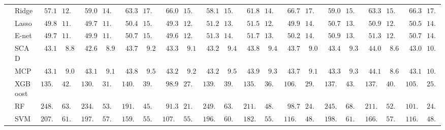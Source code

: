\begin{tabular}{p{0.2cm}p{1cm}|p{0.6cm}p{0.6cm}|p{0.6cm}p{0.6cm}p{0.6cm}p{0.6cm}p{0.6cm}p{0.6cm}|p{0.6cm}p{0.6cm}p{0.6cm}p{0.6cm}p{0.6cm}p{0.6cm}|p{0.6cm}p{0.6cm}p{0.6cm}p{0.6cm}p{0.6cm}p{0.6cm}}
 & Ridge  & $\phantom{0}57.10$ & $12.52$ & $\phantom{0}59.04$ & $14.93$ & $\phantom{0}63.31$ & $17.65$ & $\phantom{0}66.07$ & $15.44$ & $\phantom{0}58.14$ & $15.81$ & $\phantom{0}61.86$ & $14.53$ & $\phantom{0}66.75$ & $17.06$ & $\phantom{0}59.05$ & $15.22$ & $\phantom{0}63.33$ & $15.43$ & $\phantom{0}66.31$ & $17.89$ \\
 & Lasso  & $\phantom{0}49.81$ & $11.71$ & $\phantom{0}49.71$ & $11.93$ & $\phantom{0}50.42$ & $15.09$ & $\phantom{0}49.32$ & $12.76$ & $\phantom{0}51.21$ & $13.98$ & $\phantom{0}51.53$ & $12.83$ & $\phantom{0}49.91$ & $14.84$ & $\phantom{0}50.70$ & $13.98$ & $\phantom{0}50.96$ & $12.09$ & $\phantom{0}50.52$ & $14.55$ \\
 & E-net  & $\phantom{0}49.78$ & $11.75$ & $\phantom{0}49.91$ & $11.82$ & $\phantom{0}50.79$ & $15.58$ & $\phantom{0}49.60$ & $12.82$ & $\phantom{0}51.38$ & $14.04$ & $\phantom{0}51.78$ & $13.08$ & $\phantom{0}50.20$ & $14.89$ & $\phantom{0}50.95$ & $13.91$ & $\phantom{0}51.30$ & $12.26$ & $\phantom{0}50.70$ & $14.58$ \\
 & SCAD  & $\phantom{0}43.13$ & $\phantom{0}8.80$ & $\phantom{0}42.60$ & $\phantom{0}8.91$ & $\phantom{0}43.78$ & $\phantom{0}9.28$ & $\phantom{0}43.31$ & $\phantom{0}9.13$ & $\phantom{0}43.26$ & $\phantom{0}9.40$ & $\phantom{0}43.88$ & $\phantom{0}9.43$ & $\phantom{0}43.79$ & $\phantom{0}9.06$ & $\phantom{0}43.49$ & $\phantom{0}9.32$ & $\phantom{0}44.06$ & $\phantom{0}8.60$ & $\phantom{0}43.07$ & $10.14$ \\
 & MCP  & $\phantom{0}43.11$ & $\phantom{0}9.06$ & $\phantom{0}43.16$ & $\phantom{0}9.11$ & $\phantom{0}43.81$ & $\phantom{0}9.56$ & $\phantom{0}43.21$ & $\phantom{0}9.29$ & $\phantom{0}43.23$ & $\phantom{0}9.54$ & $\phantom{0}43.93$ & $\phantom{0}9.38$ & $\phantom{0}43.78$ & $\phantom{0}9.17$ & $\phantom{0}43.31$ & $\phantom{0}9.32$ & $\phantom{0}44.16$ & $\phantom{0}8.66$ & $\phantom{0}43.18$ & $10.33$ \\
 & XGBoost  & $135.14$ & $42.27$ & $130.40$ & $31.97$ & $140.36$ & $39.19$ & $\phantom{0}98.96$ & $27.35$ & $139.77$ & $39.97$ & $135.79$ & $36.04$ & $106.84$ & $29.00$ & $137.05$ & $43.08$ & $137.13$ & $40.92$ & $105.88$ & $25.90$ \\
 & RF  & $248.10$ & $63.21$ & $234.96$ & $53.56$ & $191.50$ & $45.02$ & $\phantom{0}91.31$ & $21.77$ & $249.60$ & $63.00$ & $211.29$ & $48.38$ & $\phantom{0}98.71$ & $24.80$ & $245.15$ & $68.82$ & $211.40$ & $52.49$ & $101.87$ & $24.11$ \\
 & SVM  & $207.71$ & $61.55$ & $197.11$ & $57.98$ & $159.04$ & $55.73$ & $107.77$ & $55.70$ & $196.65$ & $60.89$ & $182.60$ & $55.31$ & $116.76$ & $48.12$ & $198.36$ & $61.76$ & $166.94$ & $57.46$ & $116.65$ & $48.17$ \\
\hline 
\end{tabular}


